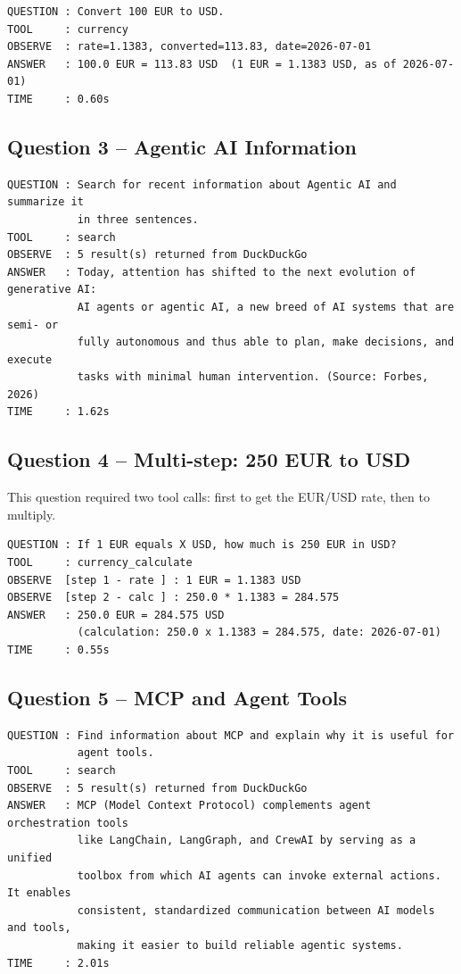 \documentclass[11pt,a4paper]{article}
\begin{document}
\begin{lstlisting}
QUESTION : Convert 100 EUR to USD.
TOOL     : currency
OBSERVE  : rate=1.1383, converted=113.83, date=2026-07-01
ANSWER   : 100.0 EUR = 113.83 USD  (1 EUR = 1.1383 USD, as of 2026-07-01)
TIME     : 0.60s
\end{lstlisting}

\subsection{Question 3 -- Agentic AI Information}

\begin{lstlisting}
QUESTION : Search for recent information about Agentic AI and summarize it
           in three sentences.
TOOL     : search
OBSERVE  : 5 result(s) returned from DuckDuckGo
ANSWER   : Today, attention has shifted to the next evolution of generative AI:
           AI agents or agentic AI, a new breed of AI systems that are semi- or
           fully autonomous and thus able to plan, make decisions, and execute
           tasks with minimal human intervention. (Source: Forbes, 2026)
TIME     : 1.62s
\end{lstlisting}

\subsection{Question 4 -- Multi-step: 250 EUR to USD}

This question required two tool calls: first to get the EUR/USD rate, then to multiply.

\begin{lstlisting}
QUESTION : If 1 EUR equals X USD, how much is 250 EUR in USD?
TOOL     : currency_calculate
OBSERVE  [step 1 - rate ] : 1 EUR = 1.1383 USD
OBSERVE  [step 2 - calc ] : 250.0 * 1.1383 = 284.575
ANSWER   : 250.0 EUR = 284.575 USD
           (calculation: 250.0 x 1.1383 = 284.575, date: 2026-07-01)
TIME     : 0.55s
\end{lstlisting}

\subsection{Question 5 -- MCP and Agent Tools}

\begin{lstlisting}
QUESTION : Find information about MCP and explain why it is useful for
           agent tools.
TOOL     : search
OBSERVE  : 5 result(s) returned from DuckDuckGo
ANSWER   : MCP (Model Context Protocol) complements agent orchestration tools
           like LangChain, LangGraph, and CrewAI by serving as a unified
           toolbox from which AI agents can invoke external actions. It enables
           consistent, standardized communication between AI models and tools,
           making it easier to build reliable agentic systems.
TIME     : 2.01s
\end{lstlisting}
\end{document}
